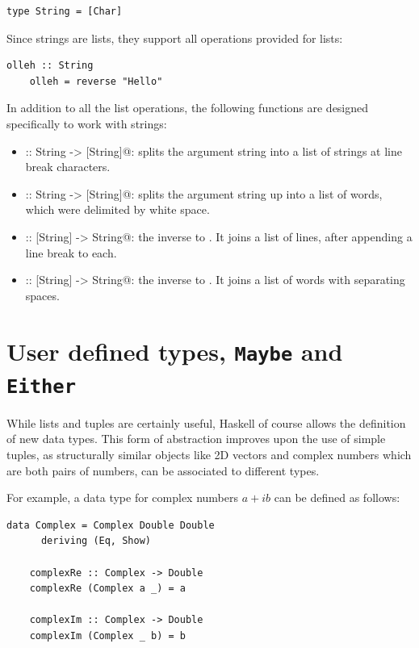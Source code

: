 \documentclass[UdineBachThesis,american,11pt]{PhdThesis}
\begin{document}
  \begin{lstlisting}[gobble=4,basicstyle=\ttfamily\small]
    type String = [Char]
  \end{lstlisting}

  Since strings are lists, they support all operations provided for lists:

  \begin{lstlisting}[gobble=4,basicstyle=\ttfamily\small]
    olleh :: String
    olleh = reverse "Hello"
  \end{lstlisting}

  In addition to all the list operations, the following functions are designed
  specifically to work with strings:

  \begin{itemize}
    \item \lstinline@lines :: String -> [String]@: splits the argument string
    into a list of strings at line break characters.

    \item \lstinline@words :: String -> [String]@: splits the argument string up
    into a list of words, which were delimited by white space.

    \item \lstinline@unlines :: [String] -> String@: the inverse to
    \lstinline@lines@. It joins a list of lines, after appending a line break to
    each.

    \item \lstinline@unwords :: [String] -> String@: the inverse to
    \lstinline@words@. It joins a list of words with separating spaces.
  \end{itemize}

  \section{User defined types, \texttt{Maybe} and \texttt{Either}}
  \label{section:user-defined-types}

  While lists and tuples are certainly useful, Haskell of course allows the
  definition of new data types. This form of abstraction improves upon the use
  of simple tuples, as structurally similar objects like 2D vectors and complex
  numbers which are both pairs of numbers, can be associated to different types.

  For example, a data type for complex numbers $a + i b$ can be defined as
  follows:

  \begin{lstlisting}[gobble=4,basicstyle=\ttfamily\small]
    data Complex = Complex Double Double
      deriving (Eq, Show)

    complexRe :: Complex -> Double
    complexRe (Complex a _) = a

    complexIm :: Complex -> Double
    complexIm (Complex _ b) = b
  \end{lstlisting}
\end{document}
